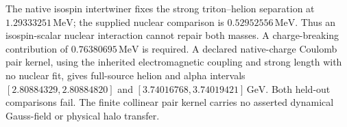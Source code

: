 The native isospin intertwiner fixes the strong triton--helion separation
at $1.29333251\,\mathrm{MeV}$; the supplied nuclear comparison is
$0.52952556\,\mathrm{MeV}$. Thus an isospin-scalar nuclear interaction cannot
repair both masses. A charge-breaking contribution of
$0.76380695\,\mathrm{MeV}$ is required. A declared native-charge Coulomb
pair kernel, using the inherited electromagnetic coupling and strong
length with no nuclear fit, gives full-source helion and alpha intervals
$[2.80884329,2.80884820]$ and $[3.74016768,3.74019421]\,\mathrm{GeV}$.
Both held-out comparisons fail. The finite collinear pair kernel carries
no asserted dynamical Gauss-field or physical halo transfer.
